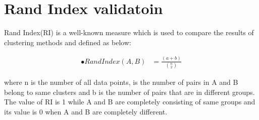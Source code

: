 \documentclass[a4paper]{article}
\begin{document}
	

\section{Rand Index validatoin}	
	Rand Index(RI) is a well-known measure which is used to compare the results of clustering
methods and defined as below:

	
	\begin{eqnarray}
	 •Rand Index(A,B) &= \frac{(a+b)}{{n\choose 2}}
	 \end{eqnarray}
	 
	 where n is the number of all data points, is the number of pairs in A and B belong to same clusters and
b is the number of pairs that are in different groups. The value of RI is 1 while A and B are completely
consisting of same groups and its value is 0 when A and B are completely different.
	  
\end{document}
